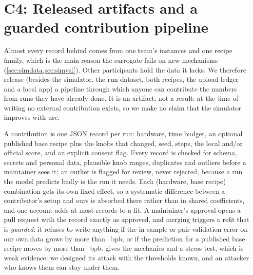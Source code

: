 \section{C4: Released artifacts and a guarded contribution pipeline}
\label{sec:contrib}

Almost every record behind \ffsim{} comes from one team's instances and one recipe family, which is the main reason
the surrogate fails on new mechanisms (\cref{sec:simdata,sec:simval}). Other participants hold the data it lacks. We therefore
release (besides the simulator, the run dataset, both recipes, the upload ledger and a local app) a pipeline through
which anyone can contribute the numbers from runs they have already done. It is an artifact, not a result: at the time
of writing no external contribution exists, so we make no claim that the simulator improves with use.

A contribution is one JSON record per run: hardware, time budget, an optional published base recipe plus the knobs
that changed, seed, steps, the local and/or official score, and an explicit consent flag. Every record is checked for
schema, secrets and personal data, plausible knob ranges, duplicates and outliers before a maintainer sees it; an
outlier is flagged for review, never rejected, because a run the model predicts badly is the run it needs. Each
(hardware, base recipe) combination gets its own fixed effect, so a systematic difference between a contributor's
setup and ours is absorbed there rather than in shared coefficients, and one account adds at most 
records to a fit. A maintainer's approval opens a pull request with the record exactly as approved, and merging
triggers a refit that is \emph{guarded}: it refuses to write anything if the in-sample or pair-validation error on our
own data grows by more than ~bpb, or if the prediction for a published base recipe moves by more
than ~bpb.  gives the mechanics and a stress test, which is weak evidence:
we designed its attack with the thresholds known, and an attacker who knows them can stay under them.
